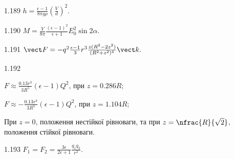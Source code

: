 \begin{Solution}{1.{189}}
	$h = \frac{\epsilon - 1}{8\pi g \rho} \left(\frac{V}{d} \right)^2$.
\end{Solution}
\begin{Solution}{1.{190}}
	$M = \frac{V}{8\pi} \frac{(\epsilon - 1)^2}{\epsilon + 1} E_0^2\sin2\alpha$.
\end{Solution}
\begin{Solution}{1.{191}}
	$\vect F = - q^2\frac{\epsilon - 1}{3}r^3 \frac{z(R^2 - 2z^2)}{(R^2 + z^2)^4} \vect k.$
\end{Solution}
\begin{Solution}{1.{192}}
	\begin{enumerate*}[label=\alph*)]
		\item $F \approx \frac{0.13r^3}{3R^5} (\epsilon - 1) Q^2$, при $z = 0.286 R$;
		\item $F \approx - \frac{0.13r^3}{3R^5} (\epsilon - 1) Q^2$, при $z = 1.104 R$;
		\item При $z = 0$, положення нестійкої рівноваги, та при $z = \nfrac{R}{\sqrt2}$, положення стійкої рівноваги.
	\end{enumerate*}
\end{Solution}
\begin{Solution}{1.{193}}
	$F_1 = F_2 = \frac{3\epsilon}{2\epsilon + 1}\frac{q_1q_2}{r^2}$.
\end{Solution}
